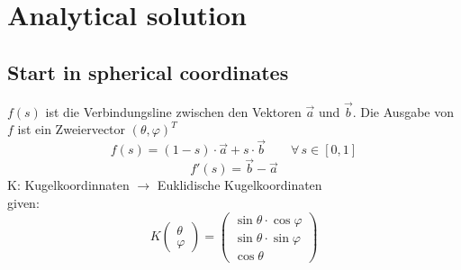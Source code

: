 \section{Analytical solution}
\subsection{Start in spherical coordinates}
$f(s)$ ist die Verbindungsline zwischen den Vektoren $\vec a$ und $\vec b$. Die Ausgabe von $f$ ist ein Zweiervector $(\theta, \varphi)^T$
\begin{equation}
    f(s)=(1-s)\cdot\vec{a}+s\cdot\vec{b}\qquad\forall\, s \in [0,1]
\end{equation}
\begin{equation}
    f'(s)=\vec{b}-\vec{a}
\end{equation}
K: Kugelkoordinnaten $\rightarrow$ Euklidische Kugelkoordinaten\\
given:
\begin{equation*}
    K \begin{pmatrix}\theta \\ \varphi\end{pmatrix}=
    \begin{pmatrix}
        \sin\theta\cdot\cos\varphi \\
        \sin\theta\cdot\sin\varphi \\
        \cos\theta
    \end{pmatrix}
\end{equation*}
